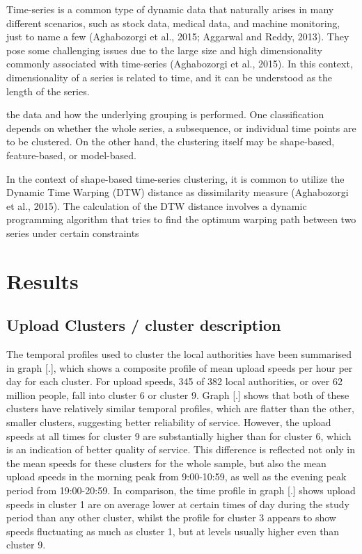 \documentclass[]{interact}
\theoremstyle{plain}%
\theoremstyle{definition}
\theoremstyle{remark}
\begin{document}
Time-series is a common type of dynamic data that naturally arises in
many different scenarios, such as stock data, medical data, and machine
monitoring, just to name a few (Aghabozorgi et al., 2015; Aggarwal and
Reddy, 2013). They pose some challenging issues due to the large size
and high dimensionality commonly associated with time-series
(Aghabozorgi et al., 2015). In this context, dimensionality of a series
is related to time, and it can be understood as the length of the
series.

the data and how the underlying grouping is performed. One
classification depends on whether the whole series, a subsequence, or
individual time points are to be clustered. On the other hand, the
clustering itself may be shape-based, feature-based, or model-based.

In the context of shape-based time-series clustering, it is common to
utilize the Dynamic Time Warping (DTW) distance as dissimilarity measure
(Aghabozorgi et al., 2015). The calculation of the DTW distance involves
a dynamic programming algorithm that tries to find the optimum warping
path between two series under certain constraints

\hypertarget{results}{%
\section{Results}\label{results}}

\hypertarget{upload-clusters-cluster-description}{%
\subsection{Upload Clusters / cluster
description}\label{upload-clusters-cluster-description}}

The temporal profiles used to cluster the local authorities have been
summarised in graph {[}.{]}, which shows a composite profile of mean
upload speeds per hour per day for each cluster. For upload speeds, 345
of 382 local authorities, or over 62 million people, fall into cluster 6
or cluster 9. Graph {[}.{]} shows that both of these clusters have
relatively similar temporal profiles, which are flatter than the other,
smaller clusters, suggesting better reliability of service. However, the
upload speeds at all times for cluster 9 are substantially higher than
for cluster 6, which is an indication of better quality of service. This
difference is reflected not only in the mean speeds for these clusters
for the whole sample, but also the mean upload speeds in the morning
peak from 9:00-10:59, as well as the evening peak period from
19:00-20:59. In comparison, the time profile in graph {[}.{]} shows
upload speeds in cluster 1 are on average lower at certain times of day
during the study period than any other cluster, whilst the profile for
cluster 3 appears to show speeds fluctuating as much as cluster 1, but
at levels usually higher even than cluster 9.
\end{document}
